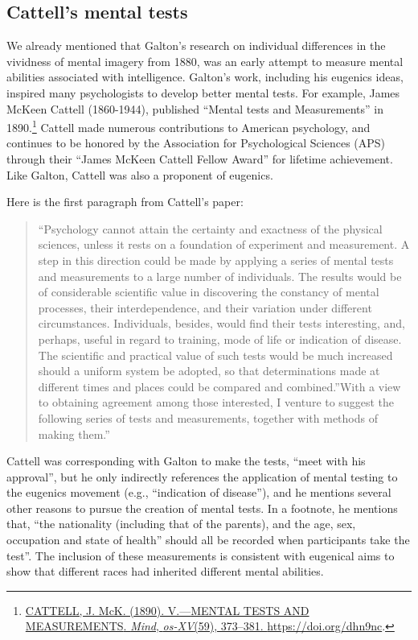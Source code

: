 \documentclass[
  oneside,
  12pt]{crumpbook}
\begin{document}
\hypertarget{cattells-mental-tests}{%
\subsection{Cattell's mental tests}\label{cattells-mental-tests}}

We already mentioned that Galton's research on individual differences in the vividness of mental imagery from 1880, was an early attempt to measure mental abilities associated with intelligence. Galton's work, including his eugenics ideas, inspired many psychologists to develop better mental tests. For example, James McKeen Cattell (1860-1944), published ``Mental tests and Measurements'' in 1890.\footnote{\protect\hyperlink{ref-cattellMENTALTESTSMEASUREMENTS1890}{CATTELL, J. McK. (1890). V.---{MENTAL TESTS AND MEASUREMENTS}. \emph{Mind}, \emph{os-XV}(59), 373--381. \url{https://doi.org/dhn9nc}}.} Cattell made numerous contributions to American psychology, and continues to be honored by the Association for Psychological Sciences (APS) through their ``James McKeen Cattell Fellow Award'' for lifetime achievement. Like Galton, Cattell was also a proponent of eugenics.

Here is the first paragraph from Cattell's paper:

\begin{quote}
``Psychology cannot attain the certainty and exactness of the physical sciences, unless it rests on a foundation of experiment and measurement. A step in this direction could be made by applying a series of mental tests and measurements to a large number of individuals. The results would be of considerable scientific value in discovering the constancy of mental processes, their interdependence, and their variation under different circumstances. Individuals, besides, would find their tests interesting, and, perhaps, useful in regard to training, mode of life or indication of disease. The scientific and practical value of such tests would be much increased should a uniform system be adopted, so that determinations made at different times and places could be compared and combined.''With a view to obtaining agreement among those interested, I venture to suggest the following series of tests and measurements, together with methods of making them.''
\end{quote}

Cattell was corresponding with Galton to make the tests, ``meet with his approval'', but he only indirectly references the application of mental testing to the eugenics movement (e.g., ``indication of disease''), and he mentions several other reasons to pursue the creation of mental tests. In a footnote, he mentions that, ``the nationality (including that of the parents), and the age, sex, occupation and state of health'' should all be recorded when participants take the test''. The inclusion of these measurements is consistent with eugenical aims to show that different races had inherited different mental abilities.
\end{document}
